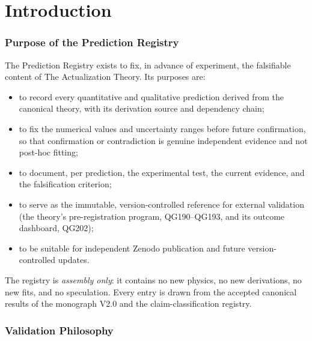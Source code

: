 \documentclass[11pt,a4paper]{article}
\begin{document}
\clearpage

\tableofcontents
\clearpage

\part{Introduction}

\section{Purpose of the Prediction Registry}
\label{sec:purpose}

The Prediction Registry exists to fix, in advance of experiment, the falsifiable content of
The Actualization Theory. Its purposes are:

\begin{itemize}
  \item to record every quantitative and qualitative prediction derived from the canonical
        theory, with its derivation source and dependency chain;
  \item to fix the numerical values and uncertainty ranges before future confirmation, so
        that confirmation or contradiction is genuine independent evidence and not post-hoc
        fitting;
  \item to document, per prediction, the experimental test, the current evidence, and the
        falsification criterion;
  \item to serve as the immutable, version-controlled reference for external validation
        (the theory's pre-registration program, QG190--QG193, and its outcome dashboard,
        QG202);
  \item to be suitable for independent Zenodo publication and future version-controlled
        updates.
\end{itemize}

The registry is \emph{assembly only}: it contains no new physics, no new derivations, no new
fits, and no speculation. Every entry is drawn from the accepted canonical results of the
monograph V2.0 and the claim-classification registry.

\section{Validation Philosophy}
\label{sec:philosophy}
\end{document}
